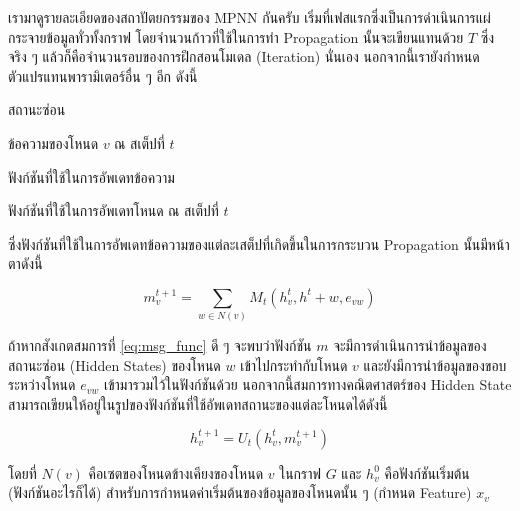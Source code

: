 เรามาดูรายละเอียดของสถาปัตยกรรมของ MPNN กันครับ เริ่มที่เฟสแรกซึ่งเป็นการดำเนินการแผ่กระจายข้อมูลทั่วทั้งกราฟ โดยจำนวนก้าวที่ใช้ในการทำ Propagation นั้นจะเขียนแทนด้วย $T$ ซึ่งจริง ๆ แล้วก็คือจำนวนรอบของการฝึกสอนโมเดล (Iteration) นั่นเอง นอกจากนี้เรายังกำหนดตัวแปรแทนพารามิเตอร์อื่น ๆ อีก ดังนี้

\begin{description}[font=$\bullet$,labelindent=2em,labelwidth=2cm,labelsep=0em]
    \item[\ $h$] สถานะซ่อน

    \item[\ $m^{t}_{v}$] ข้อความของโหนด $v$ ณ สเต็ปที่ $t$

    \item[\ $M$] ฟังก์ชันที่ใช้ในการอัพเดทข้อความ

    \item[\ $U_{t}$] ฟังก์ชันที่ใช้ในการอัพเดทโหนด ณ สเต็ปที่ $t$
\end{description}

\noindent ซึ่งฟังก์ชันที่ใช้ในการอัพเดทข้อความของแต่ละเสต็ปที่เกิดขึ้นในการกระบวน Propagation นั้นมีหน้าตาดังนี้

\begin{equation}\label{eq:msg_func}
    m^{t+1}_{v} = \sum_{w \in N(v)} M_{t} (h^{t}_{v}, h^{t}+{w}, e_{vw})
\end{equation}

ถ้าหากสังเกตสมการที่ \eqref{eq:msg_func} ดี ๆ จะพบว่าฟังก์ชัน $m$ จะมีการดำเนินการนำข้อมูลของสถานะซ่อน (Hidden States) ของโหนด $w$ เข้าไปกระทำกับโหนด $v$ และยังมีการนำข้อมูลของขอบระหว่างโหนด $e_{vw}$ เข้ามารวมไว้ในฟังก์ชันด้วย นอกจากนี้สมการทางคณิตศาสตร์ของ Hidden State สามารถเขียนให้อยู่ในรูปของฟังก์ชันที่ใช้อัพเดทสถานะของแต่ละโหนดได้ดังนี้

\begin{equation}\label{eq:hidden_func}
    h^{t+1}_{v} = U_{t}(h^{t}_{v}, m^{t+1}_{v})
\end{equation}

\noindent โดยที่ $N(v)$ คือเซตของโหนดข้างเคียงของโหนด $v$ ในกราฟ $G$ และ $h^{0}_{v}$ คือฟังก์ชันเริ่มต้น (ฟังก์ชันอะไรก็ได้) สำหรับการกำหนดค่าเริ่มต้นของข้อมูลของโหนดนั้น ๆ (กำหนด Feature) $x_{v}$

\begin{center}
\end{center}

